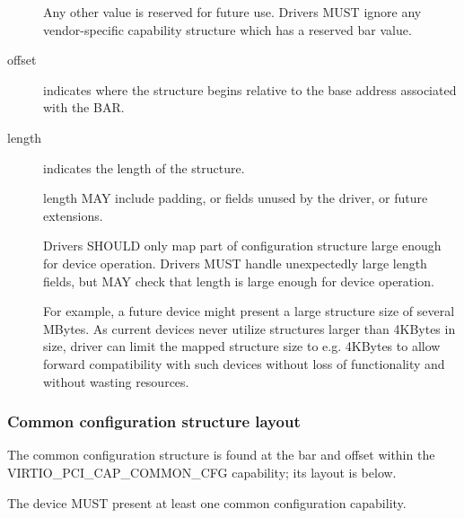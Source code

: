 \begin{description}
        Any other value is reserved for future use. Drivers MUST
        ignore any vendor-specific capability structure which has
        a reserved bar value.

\item[offset]
        indicates where the structure begins relative to the base address associated
        with the BAR.

\item[length]
        indicates the length of the structure.

        length MAY include padding, or fields unused by the driver, or
        future extensions.

        Drivers SHOULD only map part of configuration structure
        large enough for device operation.  Drivers MUST handle
        unexpectedly large length fields, but MAY check that length
        is large enough for device operation.

        For example, a future device might present a large structure size of several
        MBytes.
        As current devices never utilize structures larger than 4KBytes in size,
        driver can limit the mapped structure size to e.g.
        4KBytes to allow forward compatibility with such devices without loss of
        functionality and without wasting resources.
\end{description}

\subsubsection{Common configuration structure layout}\label{sec:Virtio Transport Options / Virtio Over PCI Bus / PCI Device Layout / Common configuration structure layout}

The common configuration structure is found at the bar and offset within the VIRTIO_PCI_CAP_COMMON_CFG capability; its layout is below.

The device MUST present at least one common configuration capability.

